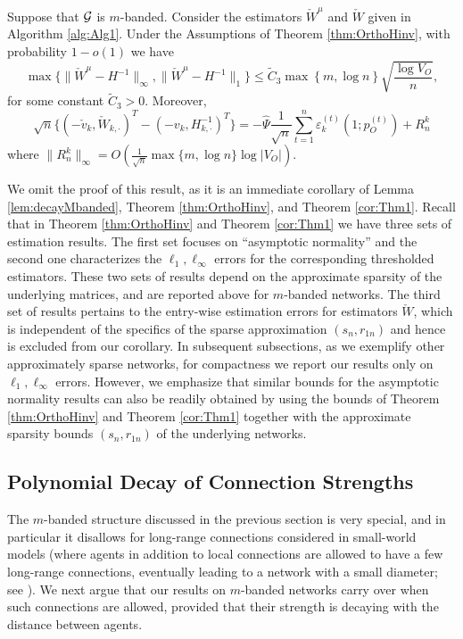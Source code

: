 \documentclass[opre,nonblindrev]{informs3} %
\newcommand{\rowdot}{\cdot}
\begin{document}
\begin{corollary}
	Suppose that  $\cal G$ is $m$-banded.
	Consider the estimators
	$\check W^\mu$ and $\check W$
	given  in 
	Algorithm \ref{alg:Alg1}.
Under the Assumptions of Theorem \ref{thm:OrthoHinv}, with probability $1-o(1)$ we have
	\[
	\max {\bigg \{ }
	\| \check W^\mu-H^{-1}\|_\infty  , \|
	\check W^\mu-H^{-1}
	\|_1
	{\bigg \} }
	\leq
\tilde{C}_3 \max\left\{m,  \log {n}  \right\} 
	\sqrt{\frac{\log V_O}{n} },\]
	for some constant $\tilde{C}_3>0$.
	Moreover,
	\[\sqrt{n}\{ (-\check{{v}}_k, \check W_{k,\rowdot})^T - (-v_k, H^{-1}_{k,\rowdot})^T\} =   - \hat \Psi\frac{1}{\sqrt{n}}\sum_{t=1}^n \varepsilon_{k}^{(t)}(1;{p}_O^{(t)}) + R^k_n\]
	where
	$\|R^k_n\|_\infty 
	= O\left(\frac{1}{\sqrt{n}}  \max\{m,\log n \} 
		\log |V_O|   \right)$.
\end{corollary}
We omit the proof of this result, as it is an immediate corollary of Lemma \ref{lem:decayMbanded},
Theorem \ref{thm:OrthoHinv}, and Theorem \ref{cor:Thm1}.
Recall that in
Theorem \ref{thm:OrthoHinv} and Theorem \ref{cor:Thm1}
we have three sets of estimation results. The first set
focuses on ``asymptotic normality'' and the second one 
characterizes the $\ell_1, \ell_\infty$ errors for the corresponding thresholded estimators. 
These two sets of results depend on the approximate sparsity of the underlying matrices, and  are reported above for $m$-banded networks.
The third set of results pertains to the entry-wise estimation errors for estimators $\check W$, which is independent of the specifics of the sparse approximation $(s_n,r_{1n})$ and hence is excluded from our corollary.
 In subsequent subsections,
as we exemplify other approximately sparse networks,
for compactness
we  report our results only on $\ell_1, \ell_\infty$ errors. However, we emphasize that similar bounds for the asymptotic normality results can also be readily obtained by using
the bounds of Theorem  \ref{thm:OrthoHinv} and Theorem \ref{cor:Thm1}
together with the approximate sparsity bounds $(s_n,r_{1n})$ of the underlying networks.



\subsection{Polynomial Decay of Connection Strengths}

The $m$-banded
structure discussed in the previous section is very special, and in particular it disallows for long-range connections considered in small-world models (where agents in addition to local connections are allowed to have a few long-range connections, eventually leading to a network with a small diameter;
see
\citet{watts1998collective,kleinberg2000small}).
We next argue that our results on $m$-banded networks carry over when such connections are allowed, provided that their strength is decaying with the distance between agents.
\end{document}

